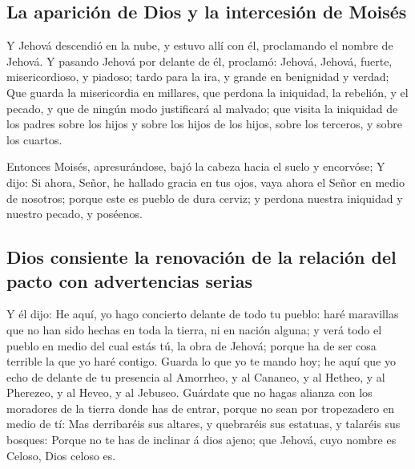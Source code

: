 \hypertarget{la-apariciuxf3n-de-dios-y-la-intercesiuxf3n-de-moisuxe9s}{%
\subsection{La aparición de Dios y la intercesión de
Moisés}\label{la-apariciuxf3n-de-dios-y-la-intercesiuxf3n-de-moisuxe9s}}

 Y Jehová descendió en la nube, y estuvo allí con él,
proclamando el nombre de Jehová.  Y pasando Jehová por
delante de él, proclamó: Jehová, Jehová, fuerte, misericordioso, y
piadoso; tardo para la ira, y grande en benignidad y verdad;
 Que guarda la misericordia en millares, que perdona la
iniquidad, la rebelión, y el pecado, y que de ningún modo justificará al
malvado; que visita la iniquidad de los padres sobre los hijos y sobre
los hijos de los hijos, sobre los terceros, y sobre los cuartos.

 Entonces Moisés, apresurándose, bajó la cabeza hacia el
suelo y encorvóse;  Y dijo: Si ahora, Señor, he hallado
gracia en tus ojos, vaya ahora el Señor en medio de nosotros; porque
este es pueblo de dura cerviz; y perdona nuestra iniquidad y nuestro
pecado, y poséenos.

\hypertarget{dios-consiente-la-renovaciuxf3n-de-la-relaciuxf3n-del-pacto-con-advertencias-serias}{%
\subsection{Dios consiente la renovación de la relación del pacto con
advertencias
serias}\label{dios-consiente-la-renovaciuxf3n-de-la-relaciuxf3n-del-pacto-con-advertencias-serias}}

 Y él dijo: He aquí, yo hago concierto delante de todo tu
pueblo: haré maravillas que no han sido hechas en toda la tierra, ni en
nación alguna; y verá todo el pueblo en medio del cual estás tú, la obra
de Jehová; porque ha de ser cosa terrible la que yo haré contigo.
 Guarda lo que yo te mando hoy; he aquí que yo echo de
delante de tu presencia al Amorrheo, y al Cananeo, y al Hetheo, y al
Pherezeo, y al Heveo, y al Jebuseo.  Guárdate que no
hagas alianza con los moradores de la tierra donde has de entrar, porque
no sean por tropezadero en medio de tí:  Mas derribaréis
sus altares, y quebraréis sus estatuas, y talaréis sus bosques:
 Porque no te has de inclinar á dios ajeno; que Jehová,
cuyo nombre es Celoso, Dios celoso es.


